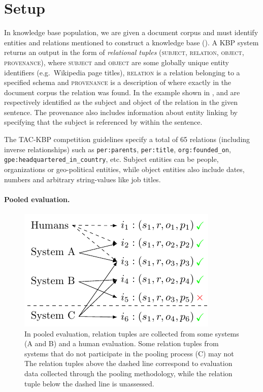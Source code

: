 \section{Setup}
\label{sec:setup}

In knowledge base population,
we are given a document corpus and must identify entities and relations mentioned to construct a knowledge base ().
A KBP system returns an output in the form of \textit{relational tuples} (\textsc{subject}, \textsc{relation}, \textsc{object}, \textsc{provenance}), where \textsc{subject} and \textsc{object} are some globally unique entity identifiers (e.g.\ Wikipedia page titles), \textsc{relation} is a relation belonging to a specified schema and \textsc{provenance} is a description of where exactly in the document corpus the relation was found.
In the example shown in ,
 and  are respectively identified as the subject and object of the relation  in the given sentence.
The provenance also includes information about entity linking by specifying that the subject  is referenced by  within the sentence.

The TAC-KBP competition guidelines specify a total of 65 relations (including inverse relationships) such as 
 \texttt{per:parents},
 \texttt{per:title},
 \texttt{org:founded\_on},
 \texttt{gpe:headquartered\_in\_country},
 etc.
Subject entities can be people, organizations or geo-political entities, while object entities also include 
dates, numbers and arbitrary string-values like job titles.

\paragraph{Pooled evaluation.}
\begin{figure}[t]
  \centering
  \includegraphics[width=0.9\columnwidth]{figures/pooling}
  \caption{\label{fig:pooling} In pooled evaluation, relation tuples are collected from some systems (A and B) and a human evaluation. Some relation tuples from systems that do not participate in the pooling process (C) may not
  The relation tuples above the dashed line correspond to evaluation data collected through the pooling methodology, while the relation tuple below the dashed line is unassessed.}  
\end{figure}

